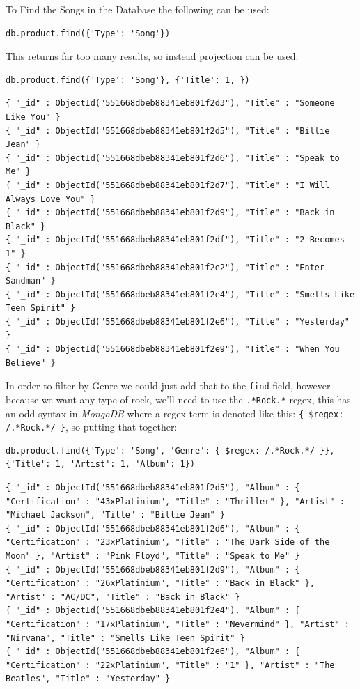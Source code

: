 \documentclass[11pt]{article}
\begin{document}
To Find the Songs in the Database the following can be used:

\begin{verbatim}
db.product.find({'Type': 'Song'})
\end{verbatim}

This returns far too many results, so instead projection can be used:

\begin{verbatim}
db.product.find({'Type': 'Song'}, {'Title': 1, })
\end{verbatim}

\begin{verbatim}
{ "_id" : ObjectId("551668dbeb88341eb801f2d3"), "Title" : "Someone Like You" }
{ "_id" : ObjectId("551668dbeb88341eb801f2d5"), "Title" : "Billie Jean" }
{ "_id" : ObjectId("551668dbeb88341eb801f2d6"), "Title" : "Speak to Me" }
{ "_id" : ObjectId("551668dbeb88341eb801f2d7"), "Title" : "I Will Always Love You" }
{ "_id" : ObjectId("551668dbeb88341eb801f2d9"), "Title" : "Back in Black" }
{ "_id" : ObjectId("551668dbeb88341eb801f2df"), "Title" : "2 Becomes 1" }
{ "_id" : ObjectId("551668dbeb88341eb801f2e2"), "Title" : "Enter Sandman" }
{ "_id" : ObjectId("551668dbeb88341eb801f2e4"), "Title" : "Smells Like Teen Spirit" }
{ "_id" : ObjectId("551668dbeb88341eb801f2e6"), "Title" : "Yesterday" }
{ "_id" : ObjectId("551668dbeb88341eb801f2e9"), "Title" : "When You Believe" }
\end{verbatim}

In order to filter by Genre we could just add that to the \texttt{find} field, however because we want any type of rock, we'll need to use the \texttt{.*Rock.*} regex, this has an odd syntax in \emph{MongoDB} where a regex term is denoted like this: \texttt{\{ \$regex: /.*Rock.*/ \}}, so putting that together:

\begin{verbatim}
db.product.find({'Type': 'Song', 'Genre': { $regex: /.*Rock.*/ }}, {'Title': 1, 'Artist': 1, 'Album': 1})
\end{verbatim}

\begin{verbatim}
{ "_id" : ObjectId("551668dbeb88341eb801f2d5"), "Album" : { "Certification" : "43xPlatinium", "Title" : "Thriller" }, "Artist" : "Michael Jackson", "Title" : "Billie Jean" }
{ "_id" : ObjectId("551668dbeb88341eb801f2d6"), "Album" : { "Certification" : "23xPlatinium", "Title" : "The Dark Side of the Moon" }, "Artist" : "Pink Floyd", "Title" : "Speak to Me" }
{ "_id" : ObjectId("551668dbeb88341eb801f2d9"), "Album" : { "Certification" : "26xPlatinium", "Title" : "Back in Black" }, "Artist" : "AC/DC", "Title" : "Back in Black" }
{ "_id" : ObjectId("551668dbeb88341eb801f2e4"), "Album" : { "Certification" : "17xPlatinium", "Title" : "Nevermind" }, "Artist" : "Nirvana", "Title" : "Smells Like Teen Spirit" }
{ "_id" : ObjectId("551668dbeb88341eb801f2e6"), "Album" : { "Certification" : "22xPlatinium", "Title" : "1" }, "Artist" : "The Beatles", "Title" : "Yesterday" }
\end{verbatim}
\end{document}
